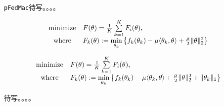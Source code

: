 \parencite{li2021pfedmac}  \texttt{pFedMac}待写。。。。

\begin{equation}
\label{eq:pfedmac}
\begin{array}{cl}
\operatorname*{minimize} & F(\theta) = \frac{1}{K} \sum\limits_{k=1}^K F_i(\theta), \\
\text{where} & F_k(\theta) := \mathop{\rm min}\limits_{\theta_k} \left\{ f_k(\theta_k) - \mu \langle \theta_k, \theta \rangle + \frac{\mu}{2} \lVert \theta \rVert^2_2 \right\}
\end{array}
\end{equation}

\begin{equation}
\label{eq:pfedmac-sparse}
\begin{array}{cl}
\operatorname*{minimize} & F(\theta) = \frac{1}{K} \sum\limits_{k=1}^K F_i(\theta), \\
\text{where} & F_k(\theta) := \mathop{\rm min}\limits_{\theta_k} \left\{ f_k(\theta_k) - \mu \langle \theta_k, \theta \rangle + \frac{\mu}{2} \lVert \theta \rVert^2_2 + \lVert \theta_k \rVert_1 \right\}
\end{array}
\end{equation}



待写。。。。
